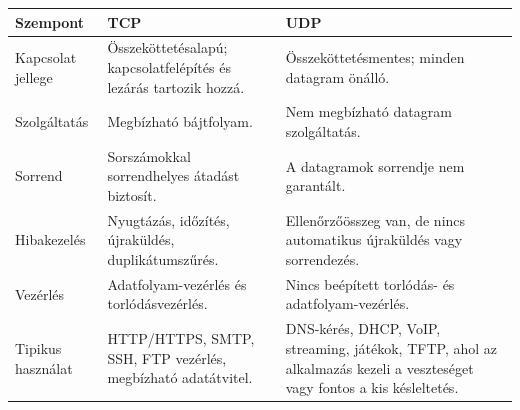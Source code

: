 \begin{tabularx}{\textwidth}{L{30mm}L{50mm}X}
\toprule
\textbf{Szempont} & \textbf{TCP} & \textbf{UDP} \\
\midrule
Kapcsolat jellege & Összeköttetésalapú; kapcsolatfelépítés és lezárás tartozik hozzá. & Összeköttetésmentes; minden datagram önálló. \\
Szolgáltatás & Megbízható bájtfolyam. & Nem megbízható datagram szolgáltatás. \\
Sorrend & Sorszámokkal sorrendhelyes átadást biztosít. & A datagramok sorrendje nem garantált. \\
Hibakezelés & Nyugtázás, időzítés, újraküldés, duplikátumszűrés. & Ellenőrzőösszeg van, de nincs automatikus újraküldés vagy sorrendezés. \\
Vezérlés & Adatfolyam-vezérlés és torlódásvezérlés. & Nincs beépített torlódás- és adatfolyam-vezérlés. \\
Tipikus használat & HTTP/HTTPS, SMTP, SSH, FTP vezérlés, megbízható adatátvitel. & DNS-kérés, DHCP, VoIP, streaming, játékok, TFTP, ahol az alkalmazás kezeli a veszteséget vagy fontos a kis késleltetés. \\
\bottomrule
\end{tabularx}
